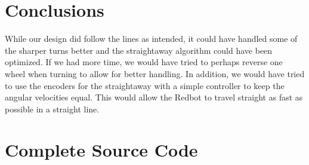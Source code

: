\documentclass{article}
\begin{document}
\section{Conclusions}
While our design did follow the lines as intended, it could have handled some of the sharper turns better and the straightaway algorithm could have been optimized.  If we had more time, we would have tried to perhaps reverse one wheel when turning to allow for better handling.  In addition, we would have tried to use the encoders for the straightaway with a simple controller to keep the angular velocities equal.  This would allow the Redbot to travel straight as fast as possible in a straight line.

\section{Complete Source Code}
\end{document}

